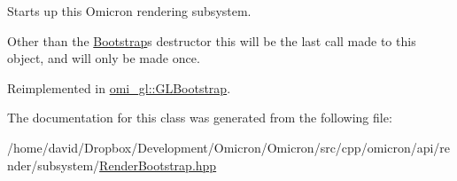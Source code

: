 Starts up this Omicron rendering subsystem. 

Other than the \hyperlink{classomi_1_1render_1_1ss_1_1_bootstrap}{Bootstrap}\textquotesingle{}s destructor this will be the last call made to this object, and will only be made once. 

Reimplemented in \hyperlink{classomi__gl_1_1_g_l_bootstrap_ae086f372b2f8e5b56087bb28c4310d14}{omi\+\_\+gl\+::\+G\+L\+Bootstrap}.



The documentation for this class was generated from the following file\+:\begin{DoxyCompactItemize}
\item 
/home/david/\+Dropbox/\+Development/\+Omicron/\+Omicron/src/cpp/omicron/api/render/subsystem/\hyperlink{_render_bootstrap_8hpp}{Render\+Bootstrap.\+hpp}\end{DoxyCompactItemize}
